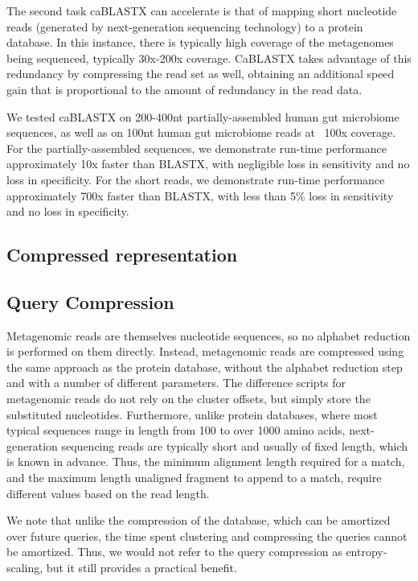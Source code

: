 \documentclass{amsbook}
\theoremstyle{definition}
\theoremstyle{remark}
\numberwithin{equation}{section}
\begin{document}
The second task caBLASTX can accelerate is that of mapping short nucleotide
reads (generated by next-generation sequencing technology) to a protein
database. In this instance, there is typically high coverage of the metagenomes
being sequenced, typically 30x-200x coverage. CaBLASTX takes advantage of this
redundancy
by compressing the read set as well, obtaining an additional speed gain that is
proportional to the amount of redundancy in the read data.


We tested caBLASTX on 200-400nt partially-assembled human gut microbiome
sequences, as well as on 100nt human gut microbiome reads at ~100x coverage.
For the partially-assembled sequences, we demonstrate run-time performance
approximately 10x faster than BLASTX, with negligible loss in sensitivity and
no loss in specificity. For the short reads, we demonstrate run-time
performance approximately 700x faster than BLASTX, with less than 5\% loss in
sensitivity and no loss in specificity.

\subsection*{Compressed representation}



\subsection*{Query Compression}

Metagenomic reads are themselves nucleotide sequences, so no alphabet reduction
is performed on them directly.
Instead, metagenomic reads are compressed using the same approach as the
protein database, without the alphabet reduction step and with a number of
different parameters.
The difference scripts for metagenomic reads do not rely on the cluster offsets,
but simply store the substituted nucleotides.
Furthermore, unlike protein databases, where most typical sequences range in 
length from 100 to over 1000 amino acids, next-generation sequencing reads are 
typically short and usually of fixed length, which is known in advance.
Thus, the minimum alignment length required for a match, and the maximum
length unaligned fragment to append to a match, require different values based
on the read length.

We note that unlike the compression of the database, which can be amortized 
over future queries, the time spent clustering and compressing the queries 
cannot be amortized.
Thus, we would not refer to the query compression as entropy-scaling, but it
still provides a practical benefit.
\end{document}

